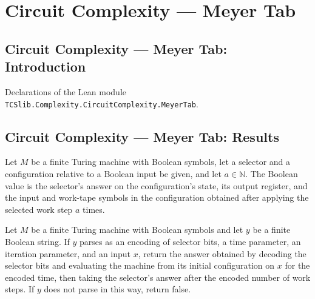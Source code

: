 \section{Circuit Complexity --- Meyer Tab}
\subsection*{Circuit Complexity --- Meyer Tab: Introduction}

Declarations of the Lean module \texttt{TCSlib.Complexity.CircuitComplexity.MeyerTab}.

\subsection*{Circuit Complexity --- Meyer Tab: Results}

\begin{definition}
\label{Complexity.Meyer.tabAns}
\leanok
{}
Let $M$ be a finite Turing machine with Boolean symbols, let a selector and a
configuration relative to a Boolean input be given, and let $a\in\mathbb{N}$. The
Boolean value is the selector’s answer on the configuration’s state, its output
register, and the input and work-tape symbols in the configuration obtained after
applying the selected work step $a$ times.
\end{definition}

\begin{definition}
\label{Complexity.Meyer.tabFun}
\leanok
{}
Let $M$ be a finite Turing machine with Boolean symbols and let $y$ be a finite Boolean
string. If $y$ parses as an encoding of selector bits, a time parameter, an iteration
parameter, and an input $x$, return the answer obtained by decoding the selector bits
and evaluating the machine from its initial configuration on $x$ for the encoded time,
then taking the selector’s answer after the encoded number of work steps. If $y$ does
not parse in this way, return false.
\end{definition}

